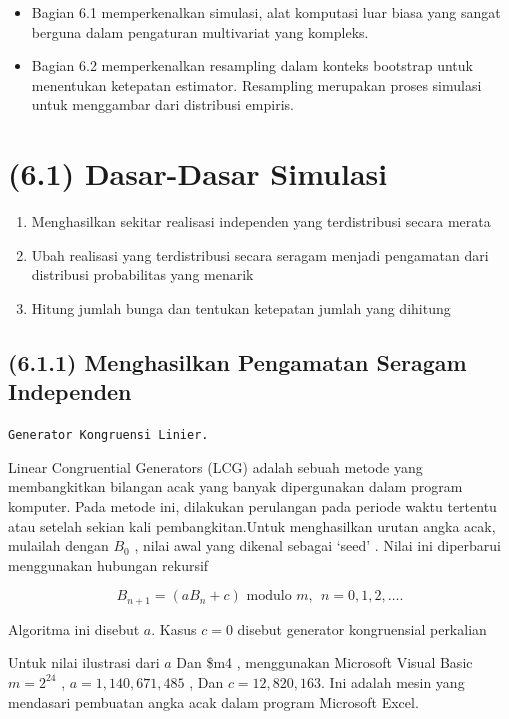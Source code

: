 \documentclass[
]{book}
\begin{document}
\begin{itemize}
\item
  Bagian 6.1 memperkenalkan simulasi, alat komputasi luar biasa yang sangat berguna dalam pengaturan multivariat yang kompleks.
\item
  Bagian 6.2 memperkenalkan resampling dalam konteks bootstrap untuk menentukan ketepatan estimator. Resampling merupakan proses simulasi untuk menggambar dari distribusi empiris.
\end{itemize}

\hypertarget{dasar-dasar-simulasi}{%
\section{(6.1) Dasar-Dasar Simulasi}\label{dasar-dasar-simulasi}}

\begin{enumerate}
\def\labelenumi{\arabic{enumi}.}
\item
  Menghasilkan sekitar realisasi independen yang terdistribusi secara merata
\item
  Ubah realisasi yang terdistribusi secara seragam menjadi pengamatan dari distribusi probabilitas yang menarik
\item
  Hitung jumlah bunga dan tentukan ketepatan jumlah yang dihitung
\end{enumerate}

\hypertarget{menghasilkan-pengamatan-seragam-independen}{%
\subsection{(6.1.1) Menghasilkan Pengamatan Seragam Independen}\label{menghasilkan-pengamatan-seragam-independen}}

\texttt{Generator\ Kongruensi\ Linier.}

Linear Congruential Generators (LCG) adalah sebuah metode yang membangkitkan bilangan acak yang banyak dipergunakan dalam program komputer. Pada metode ini, dilakukan perulangan pada periode waktu tertentu atau setelah sekian kali pembangkitan.Untuk menghasilkan urutan angka acak, mulailah dengan \(B_0\) , nilai awal yang dikenal sebagai `seed' . Nilai ini diperbarui menggunakan hubungan rekursif

\[B_{n+1} = (a B_n + c)  \text{ modulo }m, ~~ n=0, 1, 2, \ldots .\]

Algoritma ini disebut \(a\). Kasus \(c = 0\) disebut generator kongruensial perkalian

Untuk nilai ilustrasi dari \(a\) Dan \$m4 , menggunakan Microsoft Visual Basic \(m=2^{24}\) , \(a = 1 , 140 , 671 , 485\) , Dan \(c = 12 , 820 , 163\). Ini adalah mesin yang mendasari pembuatan angka acak dalam program Microsoft Excel.
\end{document}
